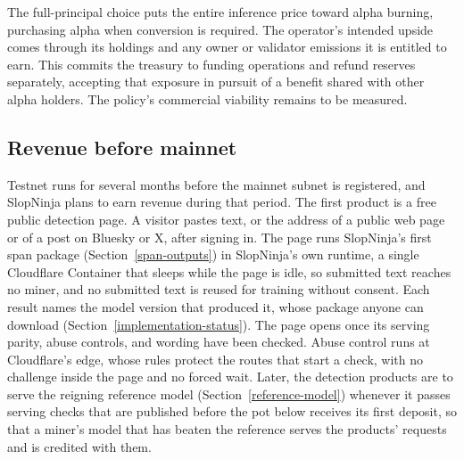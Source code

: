 The full-principal choice puts the entire inference price toward alpha burning,
purchasing alpha when conversion is required. The operator's intended upside comes
through its holdings and any owner or validator emissions it is entitled to
earn. This commits the treasury to funding operations and refund reserves
separately, accepting that exposure in pursuit of a benefit shared with other
alpha holders. The policy's commercial viability remains to be measured.

\subsection{Revenue before mainnet}\label{testnet-revenue}

Testnet runs for several months before the mainnet subnet is registered, and
SlopNinja plans to earn revenue during that period. The first product is a
free public detection page. A visitor pastes text, or the address of a public
web page or of a post on Bluesky or X, after signing in. The page runs
SlopNinja's first span package (Section~\ref{span-outputs}) in SlopNinja's own
runtime, a single Cloudflare Container that sleeps while the page is idle, so
submitted text reaches no miner, and no submitted text is reused for training
without consent. Each result names the model version that produced it, whose
package anyone can download (Section~\ref{implementation-status}). The page opens once
its serving parity, abuse controls, and wording have been checked. Abuse
control runs at Cloudflare's edge, whose rules protect the routes that start a
check, with no challenge inside the page and no forced wait. Later, the
detection products are to serve the reigning reference
model (Section~\ref{reference-model}) whenever it passes serving checks that
are published before the pot below receives its first deposit, so that a
miner's model that has beaten the reference serves the products' requests and
is credited with them.

